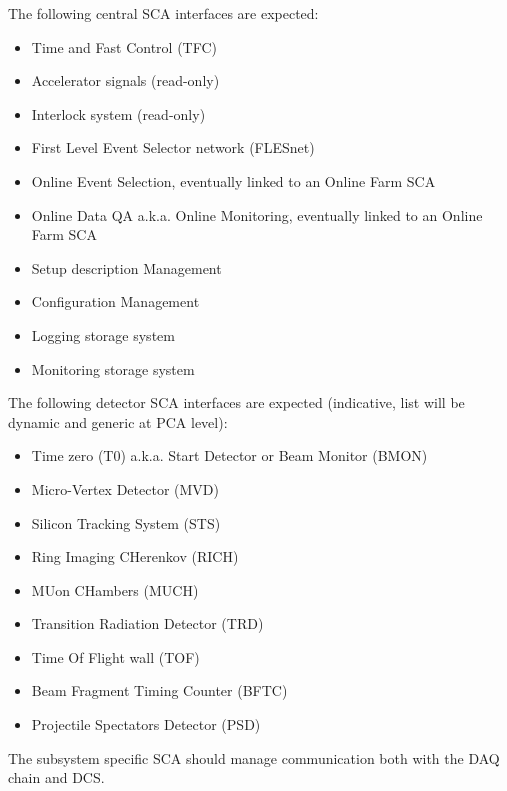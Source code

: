 The following central SCA interfaces are expected:
\begin{itemize}
 \item Time and Fast Control (TFC)
 \item Accelerator signals (read-only)
 \item Interlock system (read-only)
 \item First Level Event Selector network (FLESnet)
 \item Online Event Selection, eventually linked to an Online Farm SCA
 \item Online Data QA a.k.a. Online Monitoring, eventually linked to an Online Farm SCA
 \item Setup description Management
 \item Configuration Management
 \item Logging storage system
 \item Monitoring storage system
\end{itemize}
The following detector SCA interfaces are expected (indicative, list will be dynamic and generic at PCA level):
\begin{itemize}
 \item Time zero (T0) a.k.a. Start Detector or Beam Monitor (BMON)
 \item Micro-Vertex Detector (MVD)
 \item Silicon Tracking System (STS)
 \item Ring Imaging CHerenkov (RICH)
 \item MUon CHambers (MUCH)
 \item Transition Radiation Detector (TRD)
 \item Time Of Flight wall (TOF)
 \item Beam Fragment Timing Counter (BFTC)
 \item Projectile Spectators Detector (PSD)
\end{itemize}
The subsystem specific SCA should manage communication both with the DAQ chain and DCS. 
